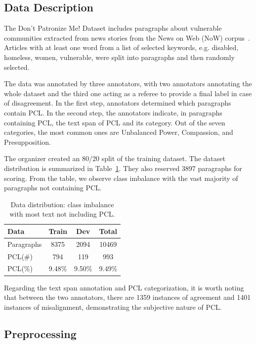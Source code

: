 \documentclass[11pt]{article}
\begin{document}
\subsection{Data Description}

The Don’t Patronize Me! Dataset includes paragraphs about vulnerable communities extracted from news stories from the News on Web (NoW) corpus~\cite{davies2013corpus}. Articles with at least one word from a list of selected keywords, e.g. disabled, homeless, women, vulnerable, were split into paragraphs and then randomly selected.

The data was annotated by three annotators, with two annotators annotating the whole dataset and the third one acting as a referee to provide a final label in case of disagreement. In the first step, annotators determined which paragraphs contain PCL. In the second step, the annotators indicate, in paragraphs containing PCL, the text span of PCL and its category. Out of the seven categories, the most common ones are Unbalanced Power, Compassion, and Presupposition.

The organizer created an 80/20 split of the training dataset. The dataset distribution is summarized in Table~\ref{tab:dist}. They also reserved 3897 paragraphs for scoring. From the table, we observe class imbalance with the vast majority of paragraphs not containing PCL.

\begin{table}
\centering
\begin{tabular}{lccc}
\hline
\textbf{Data} & \textbf{Train} & \textbf{Dev} & \textbf{Total} \\
\hline
Paragraphs & 8375 & 2094 & 10469  \\
PCL(\#) & 794 & 119 & 993  \\
\hline
PCL(\%) & 9.48\% & 9.50\% & 9.49\% \\
\hline
\end{tabular}
\caption{Data distribution: class imbalance with most text not including PCL.}
\label{tab:dist}
\end{table}

Regarding the text span annotation and PCL categorization, it is worth noting that between the two annotators, there are 1359 instances of agreement and 1401 instances of misalignment, demonstrating the subjective nature of PCL.


\subsection{Preprocessing}
\end{document}
